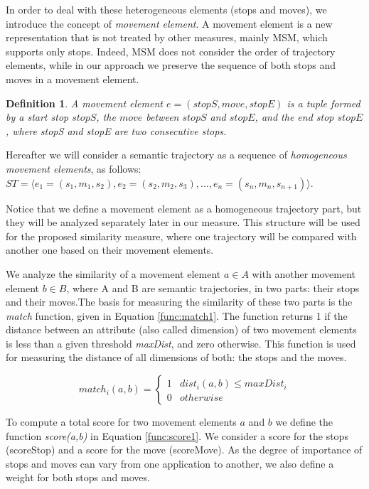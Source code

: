 \documentclass[12pt]{article}
\newtheorem{definition}{Definition}
\begin{document}
In order to deal with these heterogeneous elements (stops and moves), we introduce the concept of \emph{movement element}. A movement element is a new representation that is not treated by other measures, mainly MSM, which supports only stops. Indeed, MSM does not consider the order of trajectory elements, while in our approach we preserve the sequence of both stops and moves in a movement element.

\begin{definition}
\label{def:movement_element}
A movement element  $e=(stopS, move, stopE)$ is a tuple formed by a start stop $stopS$, the $move$ between $stopS$ and  $stopE$, and the end stop $stopE$, where stopS and stopE are two consecutive stops.
\end{definition}


Hereafter we will consider a semantic trajectory as a sequence of \textit{homogeneous movement elements}, as follows: 
$ST=\langle e_1=(s_1,m_1,s_2), e_2=(s_2,m_2,s_3), ..., e_n=(s_n,m_n,s_{n+1}) \rangle$.

Notice that we define a movement element as a homogeneous trajectory part, but they will be analyzed separately later in our measure.
This structure will be used for the proposed similarity measure, where one trajectory will be compared with another one based on their movement elements.



We analyze the similarity of a movement element $a\in A$ with another movement element $b\in B$, where A and B are semantic trajectories, in two parts: their stops and their moves.The basis for measuring the similarity of these two parts is the \emph{match} function, given in Equation \ref{func:match1}. The function returns 1 if the distance between an attribute (also called dimension) of two movement elements is less than a given threshold \emph{maxDist}, and zero otherwise. This function is used for measuring the distance of all dimensions of both: the stops and the moves.

\begin{equation}
\label{func:match1}
  match_i(a, b) = 
  \begin{cases} 
      1 & dist_i(a, b) \leq maxDist_i \\
      0 & otherwise
  \end{cases}
\end{equation}

To compute a total score for two movement elements $a$ and $b$ we define the function \emph{score(a,b)} in Equation \ref{func:score1}. We consider a score for the stops (scoreStop) and a score for the move (scoreMove). As the degree of importance of stops and moves can vary from one application to another, we also define a weight for both stops and moves. 
\end{document}
